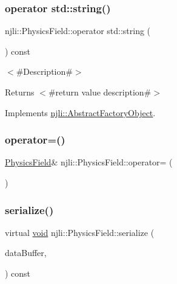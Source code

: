\subsubsection{\texorpdfstring{operator std\+::string()}{operator std::string()}}
{\footnotesize\ttfamily njli\+::\+Physics\+Field\+::operator std\+::string (\begin{DoxyParamCaption}{ }\end{DoxyParamCaption}) const\hspace{0.3cm}{\ttfamily [virtual]}}

$<$\#\+Description\#$>$

\begin{DoxyReturn}{Returns}
$<$\#return value description\#$>$ 
\end{DoxyReturn}


Implements \mbox{\hyperlink{classnjli_1_1_abstract_factory_object_a838f4fa7e65cace6098aab5222892942}{njli\+::\+Abstract\+Factory\+Object}}.

\mbox{\label{classnjli_1_1_physics_field_a45c6e394c3f7d50c2a09207c69c210c3}} 
\subsubsection{\texorpdfstring{operator=()}{operator=()}}
{\footnotesize\ttfamily \mbox{\hyperlink{classnjli_1_1_physics_field}{Physics\+Field}}\& njli\+::\+Physics\+Field\+::operator= (\begin{DoxyParamCaption}\item[{const \mbox{\hyperlink{classnjli_1_1_physics_field}{Physics\+Field}} \&}]{ }\end{DoxyParamCaption})\hspace{0.3cm}{\ttfamily [protected]}}

\mbox{\label{classnjli_1_1_physics_field_a847d3ad0028e318491a850381a33c054}} 
\subsubsection{\texorpdfstring{serialize()}{serialize()}}
{\footnotesize\ttfamily virtual \mbox{\hyperlink{_thread_8h_af1e856da2e658414cb2456cb6f7ebc66}{void}} njli\+::\+Physics\+Field\+::serialize (\begin{DoxyParamCaption}\item[{\mbox{\hyperlink{_thread_8h_af1e856da2e658414cb2456cb6f7ebc66}{void}} $\ast$}]{data\+Buffer,  }\item[{bt\+Serializer $\ast$}]{ }\end{DoxyParamCaption}) const\hspace{0.3cm}{\ttfamily [virtual]}}



